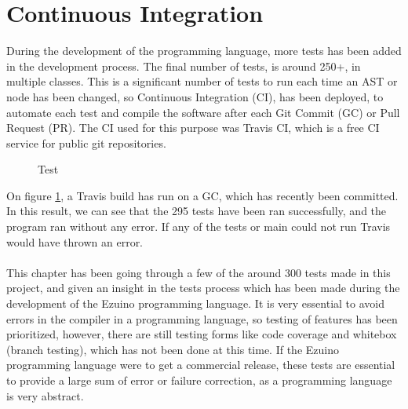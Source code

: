 \section{Continuous Integration}
During the development of the programming language, more tests has been added in the development process. The final number of tests, is around 250+, in multiple classes. This is a significant number of tests to run each time an AST or node has been changed, so Continuous Integration (CI), has been deployed, to automate each test and compile the software after each Git Commit (GC) or Pull Request (PR).  The CI used for this purpose was Travis CI, which is a free CI service for public git repositories. \\
\begin{figure}[H]
\centering
{}
\caption{Test}
\label{testa}
\end{figure}
On figure \ref{testa}, a Travis build has run on a GC, which has recently been committed. In this result, we can see that the 295 tests have been ran successfully, and the program ran without any error. If any of the tests or main could not run Travis would have thrown an error. \\
\\
This chapter has been going through a few of the around 300 tests made in this project, and given an insight in the tests process which has been made during the development of the Ezuino programming language. It is very essential to avoid errors in the compiler in a programming language, so testing of features has been prioritized, however, there are still testing forms like code coverage and whitebox (branch testing), which has not been done at this time. If the Ezuino programming language were to get a commercial release, these tests are essential to provide a large sum of error or failure correction, as a programming language is very abstract. 

